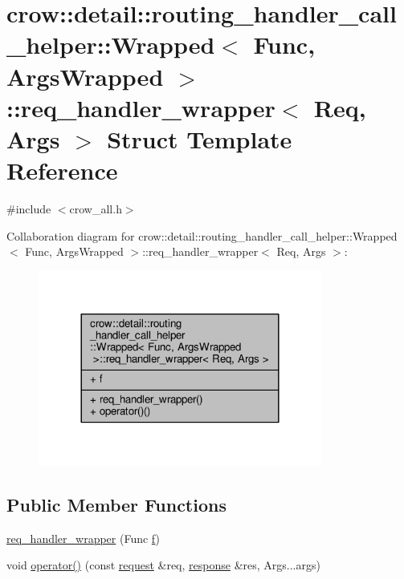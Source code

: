 \hypertarget{structcrow_1_1detail_1_1routing__handler__call__helper_1_1_wrapped_1_1req__handler__wrapper}{\section{crow\-:\-:detail\-:\-:routing\-\_\-handler\-\_\-call\-\_\-helper\-:\-:Wrapped$<$ Func, Args\-Wrapped $>$\-:\-:req\-\_\-handler\-\_\-wrapper$<$ Req, Args $>$ Struct Template Reference}
\label{structcrow_1_1detail_1_1routing__handler__call__helper_1_1_wrapped_1_1req__handler__wrapper}
}


{\ttfamily \#include $<$crow\-\_\-all.\-h$>$}



Collaboration diagram for crow\-:\-:detail\-:\-:routing\-\_\-handler\-\_\-call\-\_\-helper\-:\-:Wrapped$<$ Func, Args\-Wrapped $>$\-:\-:req\-\_\-handler\-\_\-wrapper$<$ Req, Args $>$\-:
\nopagebreak
\begin{figure}[H]
\begin{center}
\leavevmode
\includegraphics[width=264pt]{structcrow_1_1detail_1_1routing__handler__call__helper_1_1_wrapped_1_1req__handler__wrapper__coll__graph}
\end{center}
\end{figure}
\subsection*{Public Member Functions}
\begin{DoxyCompactItemize}
\item 
\hyperlink{structcrow_1_1detail_1_1routing__handler__call__helper_1_1_wrapped_1_1req__handler__wrapper_aba29fdf5c44192709c4eef8e84a48485}{req\-\_\-handler\-\_\-wrapper} (Func \hyperlink{structcrow_1_1detail_1_1routing__handler__call__helper_1_1_wrapped_1_1req__handler__wrapper_a0553c3d38f4902d9c3fa8655812ddbd7}{f})
\item 
void \hyperlink{structcrow_1_1detail_1_1routing__handler__call__helper_1_1_wrapped_1_1req__handler__wrapper_ad9cfe5f7b7d3011e4a866c46469b72df}{operator()} (const \hyperlink{structcrow_1_1request}{request} \&req, \hyperlink{structcrow_1_1response}{response} \&res, Args...\-args)
\end{DoxyCompactItemize}
